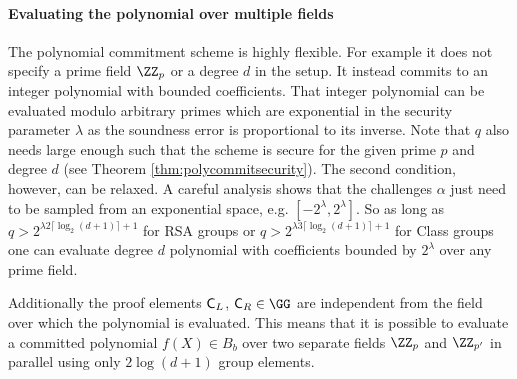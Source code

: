 \documentclass{article}
\theoremstyle{definition}
\begin{document}
\paragraph{Evaluating the polynomial over multiple fields}
The polynomial commitment scheme is highly flexible. For example it does not specify a prime field $\ZZ_p$ or a degree $d$ in the setup. It instead commits to an integer polynomial with bounded coefficients. That integer polynomial can be evaluated modulo arbitrary primes which are exponential in the security parameter $\lambda$ as the soundness error is proportional to its inverse.
Note that $q$ also needs large enough such that the scheme is secure for the given prime $p$ and degree $d$ (see Theorem \ref{thm:polycommitsecurity}). The second condition, however, can be relaxed. A careful analysis shows that the challenges $\alpha$ just need to be sampled from an exponential space, e.g. $[-2^{\lambda},2^{\lambda}]$. So as long as $q>2^{\lambda 2\lceil \log_2(d+1)\rceil+1}$ for RSA groups or  $q>2^{\lambda 3\lceil \log_2(d+1)\rceil+1}$ for Class groups one can evaluate degree $d$ polynomial with coefficients bounded by $2^\lambda$ over any prime field.

Additionally the proof elements $\mathsf{C}_L$, $\gr{C}_R \in \GG$ are independent from the field over which the polynomial is evaluated. This means that it is possible to evaluate a committed polynomial $f(X) \in B_b$ over two separate fields $\ZZ_{p}$ and $\ZZ_{p'}$ in parallel using only $2\log(d+1)$ group elements. 
\end{document}
